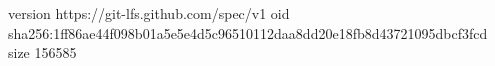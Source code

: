 version https://git-lfs.github.com/spec/v1
oid sha256:1ff86ae44f098b01a5e5e4d5c96510112daa8dd20e18fb8d43721095dbcf3fcd
size 156585
